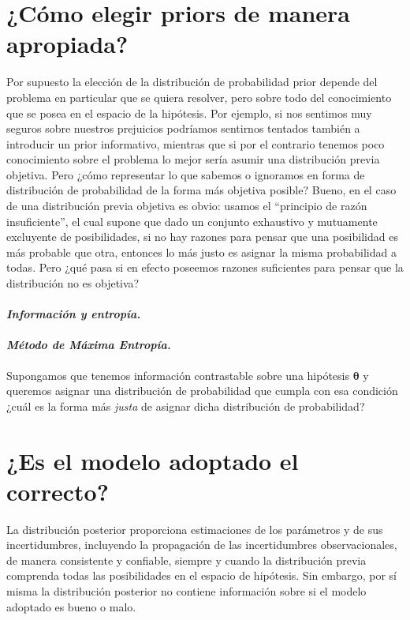 \documentclass[a4paper,twoside]{article}
\newcommand{\hip}{\ensuremath{\mathbold{\theta}}\xspace}
\begin{document}

\section{¿Cómo elegir priors de manera apropiada?}
%
Por supuesto la elección de la distribución de probabilidad prior depende del problema en particular
que se quiera resolver, pero sobre todo del conocimiento que se posea en el espacio de la hipótesis.
Por ejemplo, si nos sentimos muy seguros sobre nuestros prejuicios podríamos sentirnos tentados
también a introducir un prior informativo, mientras que si por el contrario tenemos poco
conocimiento sobre el problema lo mejor sería asumir una distribución previa objetiva. Pero ¿cómo
representar lo que sabemos o ignoramos en forma de distribución de probabilidad de la forma más
objetiva posible? Bueno, en el caso de una distribución previa objetiva es obvio: usamos el
``principio de razón insuficiente'', el cual supone que dado un conjunto exhaustivo y mutuamente
excluyente de posibilidades, si no hay razones para pensar que una posibilidad es más probable que
otra, entonces lo más justo es asignar la misma probabilidad a todas. Pero ¿qué pasa si en efecto
poseemos razones suficientes para pensar que la distribución no es objetiva?

\paragraph{\textit{\color{teal}Información y entropía.}}

\paragraph{\textit{\color{teal}Método de Máxima Entropía.}} Supongamos que tenemos información
contrastable sobre una hipótesis \(\hip\) y queremos asignar una distribución de probabilidad que
cumpla con esa condición ¿cuál es la forma más \emph{justa} de asignar dicha distribución de
probabilidad?


\section{¿Es el modelo adoptado el correcto?}

La distribución posterior proporciona estimaciones de los parámetros y de sus incertidumbres,
incluyendo la propagación de las incertidumbres observacionales, de manera consistente y confiable,
siempre y cuando la distribución previa comprenda todas las posibilidades en el espacio de
hipótesis. Sin embargo, por sí misma la distribución posterior no contiene información sobre si el
modelo adoptado es bueno o malo.
\end{document}
